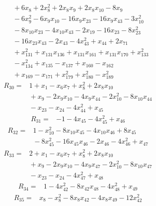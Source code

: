 {\begin{align*}
&{}  + 6x_{8} + 2x_{8}^{2} + 2x_{8} x_{9} + 2x_{8} x_{10} - 8x_{9} \\
&{}  - 6x_{9}^{2} - 6x_{9} x_{10} - 16x_{9} x_{23} - 16x_{9} x_{43} - 3x_{10}^{2} \\
&{}  - 8x_{10} x_{23} - 4x_{10} x_{43} - 2x_{19} - 16x_{23} - 8x_{23}^{2} \\
&{}  - 16x_{23} x_{43} - 2x_{43} - 4x_{43}^{2} + x_{44} + 2x_{71} \\
&{}  + x_{131}^{2} + x_{131} x_{136} + x_{131} x_{161} + x_{131} x_{170} + x_{133}^{2} \\
&{}  - x_{134}^{2} + x_{135} - x_{137} + x_{160} - x_{162} \\
&{}  + x_{169} - x_{171} + x_{179}^{2} + x_{180}^{2} - x_{189}^{2}
\end{align*}
\begin{align*}
R_{30} ={}& 1 + x_{1} - x_{6} x_{7} + x_{8}^{2} + 2x_{8} x_{10} \\
&{}  + x_{9} - 2x_{9} x_{10} - 4x_{9} x_{44} - 2x_{10}^{2} - 8x_{10} x_{44} \\
&{}  - x_{23} - x_{24} - 4x_{44}^{2} + x_{45}
\end{align*}
\begin{align*}
R_{31} ={}& -1 - 4x_{45} - 4x_{45}^{2} + x_{46}
\end{align*}
\begin{align*}
R_{32} ={}& 1 - x_{10}^{2} - 8x_{10} x_{45} - 4x_{10} x_{46} + 8x_{45} \\
&{}  - 8x_{45}^{2} - 16x_{45} x_{46} - 2x_{46} - 4x_{46}^{2} + x_{47}
\end{align*}
\begin{align*}
R_{33} ={}& 2 + x_{1} - x_{6} x_{7} + x_{8}^{2} + 2x_{8} x_{10} \\
&{}  + x_{9} - 2x_{9} x_{10} - 4x_{9} x_{47} - 2x_{10}^{2} - 8x_{10} x_{47} \\
&{}  - x_{23} - x_{24} - 4x_{47}^{2} + x_{48}
\end{align*}
\begin{align*}
R_{34} ={}& 1 - 4x_{42}^{2} - 8x_{42} x_{48} - 4x_{48}^{2} + x_{49}
\end{align*}
\begin{align*}
R_{35} ={}& x_{8} - x_{8}^{2} - 8x_{8} x_{42} - 4x_{8} x_{49} - 12x_{42}^{2} \\

\end{align*}}
